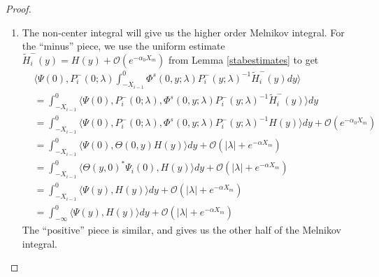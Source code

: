 \documentclass[thesis.tex]{subfiles}
\begin{document}
\begin{lemma}
\begin{proof}
\begin{enumerate}
\item The non-center integral will give us the higher order Melnikov integral. For the ``minus'' piece, we use the uniform estimate $\tilde{H}_i^-(y) = H(y) + \mathcal{O}(e^{-\alpha_0 X_m})$ from Lemma \ref{stabestimates} to get
\begin{align*}
&\langle \Psi(0), P_i^-(0; \lambda) \int_{-X_{i-1}}^0 \Phi^s(0, y; \lambda) P_i^-(y; \lambda)^{-1} \tilde{H}_i^-(y) dy \rangle \\
&= \int_{-X_{i-1}}^0 \langle \Psi(0), P_i^-(0; \lambda), \Phi^s(0, y; \lambda) P_i^-(y; \lambda)^{-1} \tilde{H}_i^-(y) \rangle dy \\
&= \int_{-X_{i-1}}^0 \langle \Psi(0), P_i^-(0; \lambda), \Phi^s(0, y; \lambda) P_i^-(y; \lambda)^{-1} H(y) \rangle dy + \mathcal{O}({e^{-\alpha_0 X_m}})\\
&= \int_{-X_{i-1}}^0 \langle \Psi(0), \Theta(0, y) H(y) \rangle dy + \mathcal{O}(|\lambda| + {e^{-\alpha X_m}})\\
&= \int_{-X_{i-1}}^0 \langle \Theta(y, 0)^* \Psi_i(0), H(y) \rangle dy + \mathcal{O}(|\lambda| + {e^{-\alpha X_m}})\\
&= \int_{-X_{i-1}}^0 \langle \Psi(y), H(y) \rangle dy + \mathcal{O}(|\lambda| + {e^{-\alpha X_m}})\\
&= \int_{-\infty}^0 \langle \Psi(y), H(y) \rangle dy + \mathcal{O}(|\lambda| + {e^{-\alpha X_m}})
\end{align*}
The ``positive'' piece is similar, and gives us the other half of the Melnikov integral.


\end{enumerate}
\end{proof}
\end{lemma}
\end{document}
